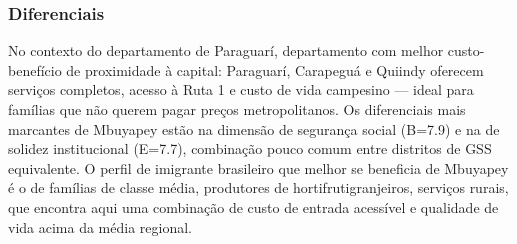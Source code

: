 \subsubsection*{Diferenciais}\label{dif-mbuyapey-0908}
No contexto do departamento de Paraguarí, departamento com melhor custo-benefício de proximidade à capital: Paraguarí, Carapeguá e Quiindy oferecem serviços completos, acesso à Ruta 1 e custo de vida campesino — ideal para famílias que não querem pagar preços metropolitanos. Os diferenciais mais marcantes de Mbuyapey estão na dimensão de segurança social (B=7.9) e na de solidez institucional (E=7.7), combinação pouco comum entre distritos de GSS equivalente. O perfil de imigrante brasileiro que melhor se beneficia de Mbuyapey é o de famílias de classe média, produtores de hortifrutigranjeiros, serviços rurais, que encontra aqui uma combinação de custo de entrada acessível e qualidade de vida acima da média regional.
